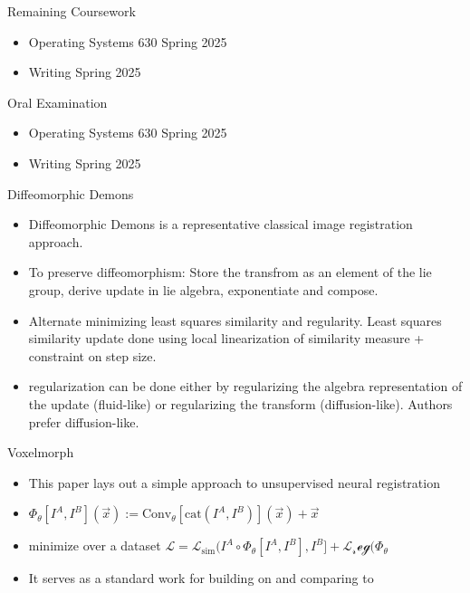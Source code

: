 \documentclass{beamer}
\begin{document}
\begin{frame}{Remaining Coursework}
        \begin{itemize}
            \item Operating Systems 630 Spring 2025
            \item Writing Spring 2025
        \end{itemize}
\end{frame}

\begin{frame}{Oral Examination}
        \begin{itemize}
            \item Operating Systems 630 Spring 2025
            \item Writing Spring 2025
        \end{itemize}
\end{frame}

\begin{frame}{Diffeomorphic Demons}
	\begin{itemize}
		\item Diffeomorphic Demons is a representative classical image registration approach.
		\item To preserve diffeomorphism: Store the transfrom as an element of the lie group, derive update in lie algebra, exponentiate and compose.
		\item Alternate minimizing least squares similarity and regularity. Least squares similarity update done using local linearization of similarity measure + constraint on step size.
		\item regularization can be done either by regularizing the algebra representation of the update (fluid-like) or regularizing the transform (diffusion-like). Authors prefer diffusion-like.

	\end{itemize}
\end{frame}

\begin{frame}{Voxelmorph}
        \begin{itemize}
              \item This paper lays out a simple approach to unsupervised neural registration
		\item $ \Phi_\theta[I^A, I^B](\vec{x}) := \text{Conv}_\theta[\text{cat}(I^A, I^B)](\vec{x}) + \vec{x} $
              \item minimize over a dataset $\mathcal{L} = \mathcal{L}_\text{sim}(I^A \circ \Phi_\theta[I^A, I^B], I^B] + \mathcal{L_reg}(\Phi_\theta$
              \item It serves as a standard work for building on and comparing to

        \end{itemize}
\end{frame}
\end{document}
